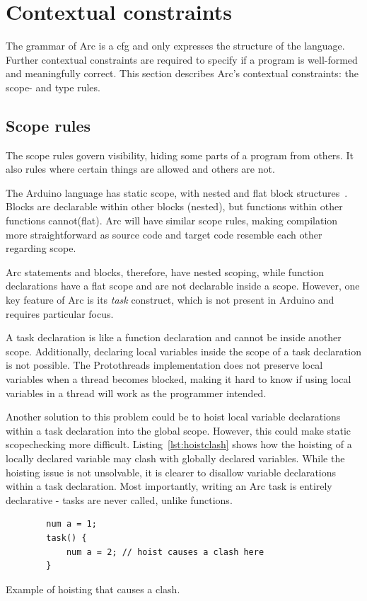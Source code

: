 \section{Contextual constraints}
The grammar of Arc is a \gls{cfg} and only expresses the structure of the language. Further contextual constraints are required to specify if a program is well-formed and meaningfully correct. This section describes Arc's contextual constraints: the scope- and type rules.

\subsection{Scope rules}\label{subsec:scoperules}
The scope rules govern visibility, hiding some parts of a program from others. It also rules where certain things are allowed and others are not.

The Arduino language has static scope, with nested and flat block structures~\cite{cppref}. Blocks are declarable within other blocks (nested), but functions within other functions cannot(flat). Arc will have similar scope rules, making compilation more straightforward as source code and target code resemble each other regarding scope.

Arc statements and blocks, therefore, have nested scoping, while function declarations have a flat scope and are not declarable inside a scope. However, one key feature of Arc is its \textit{task} construct, which is not present in Arduino and requires particular focus.

A task declaration is like a function declaration and cannot be inside another scope. Additionally, declaring local variables inside the scope of a task declaration is not possible. The Protothreads implementation does not preserve local variables when a thread becomes blocked, making it hard to know if using local variables in a thread will work as the programmer intended.

Another solution to this problem could be to hoist local variable declarations within a task declaration into the global scope. However, this could make static scopechecking more difficult. Listing~\ref{lst:hoistclash} shows how the hoisting of a locally declared variable may clash with globally declared variables. While the hoisting issue is not unsolvable, it is clearer to disallow variable declarations within a task declaration. Most importantly, writing an Arc task is entirely declarative - tasks are never called, unlike functions.


\begin{listing}[htb!]
  \begin{verbatim}
        num a = 1;
        task() {
            num a = 2; // hoist causes a clash here
        }
    \end{verbatim}
  \caption{Example of hoisting that causes a clash.}
  \label{lst:hoistclash}
\end{listing}


